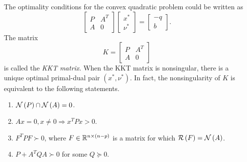 \documentclass[12pt]{article}
\begin{document}
The optimality conditions for the convex quadratic problem could be written as
\[\begin{bmatrix}
    P&A^T\\A&0
\end{bmatrix}\begin{bmatrix}
    x^\ast\\\nu^\ast
\end{bmatrix}=\begin{bmatrix}
    -q\\b
\end{bmatrix}.\]
The matrix
\[K=\begin{bmatrix}
    P&A^T\\A&0
\end{bmatrix}\]
is called the \textit{KKT matrix}. When the KKT matrix is nonsingular, there is a unique optimal primal-dual pair \(\left(x^\ast, \nu^\ast\right)\). In fact, the nonsingularity of \(K\) is equivalent to the following statements.
\begin{enumerate}
    \item \(\mathcal N\left(P\right)\cap\mathcal N\left(A\right)=0\).
    \item \(Ax=0,x\neq 0\Rightarrow x^TPx>0\).
    \item \(F^TPF\succ0\), where \(F\in\mathbb R^{n\times(n-p)}\) is a matrix for which \(\mathcal R\left(F\right)=\mathcal N\left(A\right)\).
    \item \(P+A^TQA\succ 0\) for some \(Q\succeq0\).
\end{enumerate}
\end{document}
